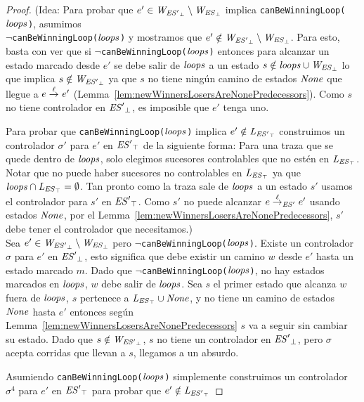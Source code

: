 \begin{proof}
	(Idea: Para probar que $e' \in \mathit{W_{\mathit{{\mathit{ES}'}_{\bot}}}} \setminus \mathit{W_{\mathit{{\mathit{ES}}_{\bot}}}}$ implica \texttt{canBeWinningLoop($\mathit{loops}$)}, asumimos \\ $\neg$\texttt{canBeWinningLoop($\mathit{loops}$)} y mostramos que $e' \notin \mathit{W_{\mathit{{\mathit{ES}'}_{\bot}}}} 
	\setminus \mathit{W_{\mathit{{\mathit{ES}}_{\bot}}}}$. Para esto, basta con ver que si
	$\neg$\texttt{canBeWinningLoop($\mathit{loops}$)} entonces para alcanzar un estado marcado desde $e'$ se debe salir de $\mathit{loops}$ a un estado $s \notin \mathit{loops} \cup \mathit{W_{\mathit{{\mathit{ES}}_{\bot}}}}$ lo que implica $s \notin \mathit{W_{\mathit{{\mathit{ES}'}_{\bot}}}}$ 
	ya que $s$ no tiene ningún camino de estados $\mathit{None}$ que llegue a $e \overset{\ell}{\rightarrow}_{} e'$  (Lemma~\ref{lem:newWinnersLosersAreNonePredecessors}).
	Como $s$ no tiene controlador en $\mathit{{\mathit{ES}'}_{\bot}}$, es imposible que $e'$ tenga uno. 
	
	Para probar que \texttt{canBeWinningLoop($\mathit{loops}$)} implica $e' \notin \mathit{L_{\mathit{{\mathit{ES}'}_{\top}}}}$ construimos un controlador $\sigma'$ para $e'$ en $\mathit{{\mathit{ES}'}_{\top}}$ de la siguiente forma:
	Para una traza que se quede dentro de $\mathit{loops}$, solo elegimos sucesores controlables que no estén en $\mathit{L_{\mathit{{\mathit{ES}}_{\top}}}}$. Notar que no puede haber sucesores no controlables en $\mathit{L_{\mathit{{\mathit{ES}}_{\top}}}}$ ya que
	$\mathit{loops} \cap \mathit{L_{\mathit{{\mathit{ES}}_{\top}}}}= \emptyset$. Tan pronto como la traza sale de $\mathit{loops}$ a un estado $s'$ usamos el controlador para $s'$ en $\mathit{{\mathit{ES}'}_{\top}}$. 
	Como $s'$ no puede alcanzar $e \overset{\ell}{\rightarrow}_{\mathit{ES}'} 
	e'$ usando estados $\mathit{None}$, por el 
	Lemma~\ref{lem:newWinnersLosersAreNonePredecessors}, $s'$ debe tener el controlador que necesitamos.)	\\


Sea $e' \in \mathit{W_{\mathit{{\mathit{ES}'}_{\bot}}}} \setminus \mathit{W_{\mathit{{\mathit{ES}}_{\bot}}}}$ pero $\neg$\texttt{canBeWinningLoop($\mathit{loops}$)}.
Existe un controlador $\sigma$ para $e'$ en $\mathit{{\mathit{ES}'}_{\bot}}$, esto significa que debe existir un camino $w$ desde $e'$ hasta un estado marcado $m$. 
Dado que $\neg$\texttt{canBeWinningLoop($\mathit{loops}$)}, no hay estados marcados en $\mathit{loops}$, $w$ debe salir de $\mathit{loops}$. 
Sea $s$ el primer estado que alcanza $w$ fuera de $\mathit{loops}$, $s$ pertenece a $\mathit{L_{\mathit{{\mathit{ES}}_{\top}}}} \cup \mathit{None}$, y no tiene un camino de estados $\mathit{None}$ hasta $e'$ entonces según Lemma~\ref{lem:newWinnersLosersAreNonePredecessors} $s$ va a seguir sin cambiar su estado.
Dado que $s \notin \mathit{W_{\mathit{{\mathit{ES}'}_{\bot}}}}$, $s$ no tiene un controlador en $\mathit{{\mathit{ES}'}_{\bot}}$, pero $\sigma$ acepta corridas que llevan a $s$, llegamos a un absurdo.

Asumiendo \texttt{canBeWinningLoop($\mathit{loops}$)} simplemente construimos un controlador $\sigma^4$ para $e'$ en $\mathit{{\mathit{ES}'}_{\top}}$ para probar que $e' \notin \mathit{L_{\mathit{{\mathit{ES}'}_{\top}}}}$


\end{proof}
